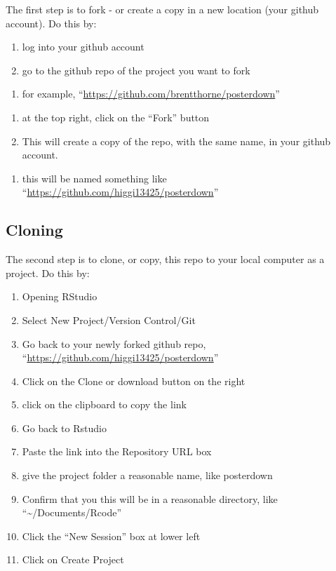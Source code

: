 \documentclass[
]{book}
\providecommand{\tightlist}{%
  \setlength{\itemsep}{0pt}\setlength{\parskip}{0pt}}
\begin{document}
The first step is to fork - or create a copy in a new location (your github account). Do this by:

\begin{enumerate}
\def\labelenumi{\arabic{enumi}.}
\tightlist
\item
  log into your github account
\item
  go to the github repo of the project you want to fork
\end{enumerate}

\begin{enumerate}
\def\labelenumi{\roman{enumi})}
\tightlist
\item
  for example, ``\url{https://github.com/brentthorne/posterdown}''
\end{enumerate}

\begin{enumerate}
\def\labelenumi{\arabic{enumi}.}
\setcounter{enumi}{2}
\tightlist
\item
  at the top right, click on the ``Fork'' button
\item
  This will create a copy of the repo, with the same name, in your github account.
\end{enumerate}

\begin{enumerate}
\def\labelenumi{\roman{enumi})}
\tightlist
\item
  this will be named something like ``\url{https://github.com/higgi13425/posterdown}''
\end{enumerate}

\hypertarget{cloning}{%
\subsection{Cloning}\label{cloning}}

The second step is to clone, or copy, this repo to your local computer as a project. Do this by:

\begin{enumerate}
\def\labelenumi{\arabic{enumi}.}
\tightlist
\item
  Opening RStudio
\item
  Select New Project/Version Control/Git
\item
  Go back to your newly forked github repo, ``\url{https://github.com/higgi13425/posterdown}''
\item
  Click on the Clone or download button on the right
\item
  click on the clipboard to copy the link
\item
  Go back to Rstudio
\item
  Paste the link into the Repository URL box
\item
  give the project folder a reasonable name, like posterdown
\item
  Confirm that you this will be in a reasonable directory, like ``\textasciitilde/Documents/Rcode''
\item
  Click the ``New Session'' box at lower left
\item
  Click on Create Project
\end{enumerate}
\end{document}
